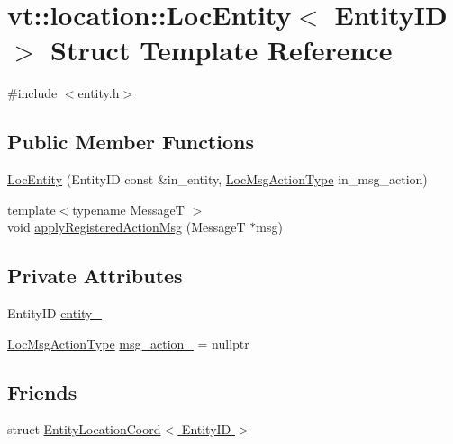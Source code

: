 \hypertarget{structvt_1_1location_1_1_loc_entity}{}\section{vt\+:\+:location\+:\+:Loc\+Entity$<$ Entity\+ID $>$ Struct Template Reference}
\label{structvt_1_1location_1_1_loc_entity}


{\ttfamily \#include $<$entity.\+h$>$}

\subsection*{Public Member Functions}
\begin{DoxyCompactItemize}
\item 
\hyperlink{structvt_1_1location_1_1_loc_entity_a41d90430d63f4e299e1c888fcf9d3238}{Loc\+Entity} (Entity\+ID const \&in\+\_\+entity, \hyperlink{namespacevt_1_1location_ad0a130e4d79e745543925240e13e8f08}{Loc\+Msg\+Action\+Type} in\+\_\+msg\+\_\+action)
\item 
{\footnotesize template$<$typename MessageT $>$ }\\void \hyperlink{structvt_1_1location_1_1_loc_entity_a7675dd0ee13bc5b759b6a4313d521e04}{apply\+Registered\+Action\+Msg} (MessageT $\ast$msg)
\end{DoxyCompactItemize}
\subsection*{Private Attributes}
\begin{DoxyCompactItemize}
\item 
Entity\+ID \hyperlink{structvt_1_1location_1_1_loc_entity_ad2d2ed3292e402f3bf8bf0f1f9c7281f}{entity\+\_\+}
\item 
\hyperlink{namespacevt_1_1location_ad0a130e4d79e745543925240e13e8f08}{Loc\+Msg\+Action\+Type} \hyperlink{structvt_1_1location_1_1_loc_entity_adb5c5c69306a18af15b7af3050a45dfa}{msg\+\_\+action\+\_\+} = nullptr
\end{DoxyCompactItemize}
\subsection*{Friends}
\begin{DoxyCompactItemize}
\item 
struct \hyperlink{structvt_1_1location_1_1_loc_entity_abf8115ee4795af8b482a657aa6195a6a}{Entity\+Location\+Coord$<$ Entity\+I\+D $>$}
\end{DoxyCompactItemize}


